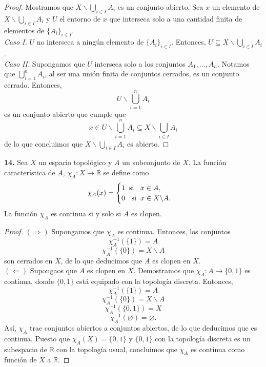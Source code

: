 \documentclass{article}
\begin{document}
\begin{proof}
	Mostramos que $X \backslash \bigcup_{i \in I} A_{i}$ es un conjunto abierto. Sea $x$ un elemento de $ X \backslash \bigcup_{i \in I} A_{i}$ y $U$ el entorno de $x$ que interseca solo a una cantidad finita de elementos de $\{A_{i} \}_{i \in I}$. \\
	
	\textit{Caso I. } $U$ no interseca a ningún elemento de $\{A_{i} \}_{i \in I}$. Entonces, $U \subseteq X \backslash \bigcup_{i \in I} A_{i}$. \\
	
	\textit{Caso II. } Supongamos que $U$ interseca solo a los conjuntos $A_{1}, \ldots, A_{n}$. Notamos que $\bigcup_{i=1}^{n} A_{i}$, al ser una unión finita de conjuntos cerrados, es un conjunto cerrado. Entonces,
	$$U \backslash \bigcup_{i = 1}^{n} A_{i} $$
	es un conjunto abierto que cumple que
	$$ x \in U \backslash \bigcup_{i = 1}^{n} A_{i} \subseteq  X \backslash \bigcup_{i \in I} A_{i}$$
	de lo que concluimos que $X \backslash \bigcup_{i \in I} A_{i}$ es abierto. 
\end{proof}

\begin{mybox}
	\textbf{14. } Sea $X$ un espacio topológico  y $A$ un subconjunto de $X$. La función característica de $A$, $\chi_{A} : X \rightarrow \mathbb{R}$ se define  como
	\begin{equation*}
	\chi_{A}(x) = 
	\begin{cases}
	1 \hspace{0.2cm} \text{si }\hspace{0.2cm} x \in A ,\\
	0 \hspace{0.2cm}\text{ si} \hspace{0.2cm} x \in X \backslash A.
	\end{cases}
	\end{equation*}
	La función $\chi_{A}$ es continua si y solo si $A$ es clopen. 
\end{mybox}	
\begin{proof}
		$(\Rightarrow)$ Supongamos que $\chi_{A}$ es continua. Entonces, los conjuntos 
		$$ \chi_{A}^{-1}(\{ 1 \}) = A $$
	   $$ \chi_{A}^{-1}(\{ 0 \}) = X \backslash A $$
son cerrados en $X$, de lo que deducimos que $A$ es clopen en $X$. \\

$(\Leftarrow)$ Supongaos que $A$ es clopen en $X$. Demostramos que $\chi_{A}: A \rightarrow \{ 0, 1\}$ es continua, donde $\{0, 1\}$ está equipado con la topología discreta.  Entonces, 
$$ \chi_{A}^{-1}(\{ 1 \}) = A$$
$$ \chi_{A}^{-1}(\{ 0 \}) = X \backslash A$$
$$ \chi_{A}^{-1}(\{ 0, 1 \}) =  X$$
$$ \chi_{A}^{-1}(\varnothing) = \varnothing.$$
Así, $\chi_{A}$  trae conjuntos abiertos a conjuntos abiertos, de lo que deducimos que es continua. Puesto que $\chi_{A}(X) = \{ 0, 1\}$ y $\{0,1\}$ con la topología discreta es un subespacio de $\mathbb{R}$ con la topología usual, concluimos que $\chi_{A}$ es continua como función de $X$ a $\mathbb{R}$.   
\end{proof}
\end{document}
